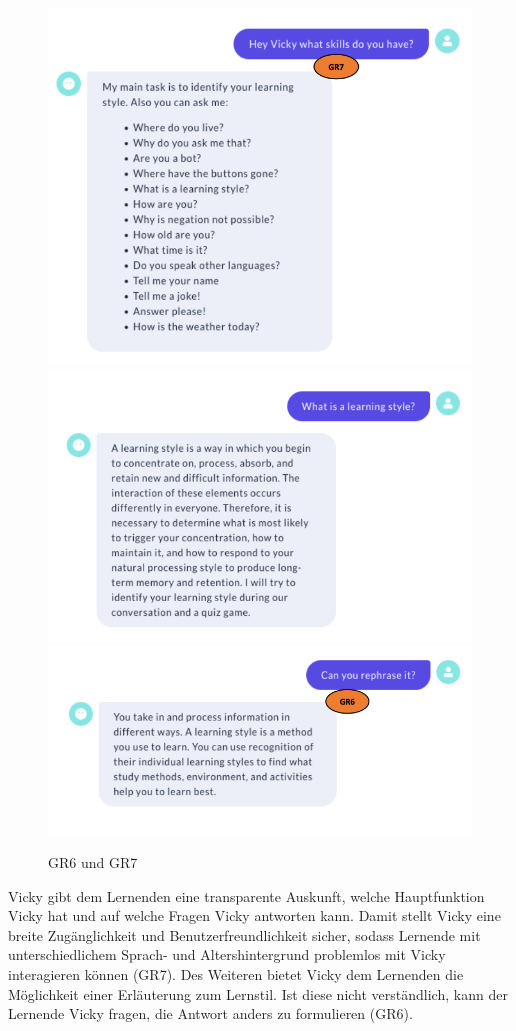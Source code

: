 \begin{figure}[H]
  \centering
  \includegraphics[width=0.7\linewidth]{images/GR67I.png}
  \includegraphics[width=0.7\linewidth]{images/GR67II.png}
  \includegraphics[width=0.7\linewidth]{images/GR67III.png}
  \caption[GR6 und GR7]{GR6 und GR7}
  \label{fig:GR6_GR7}
\end{figure} 


Vicky gibt dem Lernenden eine transparente Auskunft, 
welche Hauptfunktion Vicky hat und auf welche Fragen
Vicky antworten kann. Damit stellt Vicky eine breite Zugänglichkeit 
und Benutzerfreundlichkeit sicher, sodass Lernende mit unterschiedlichem
Sprach- und Altershintergrund problemlos mit Vicky 
interagieren können (GR7). 
Des Weiteren bietet Vicky dem Lernenden die Möglichkeit 
einer Erläuterung zum Lernstil. Ist diese nicht verständlich,
kann der Lernende Vicky fragen, die Antwort anders zu formulieren
(GR6).

